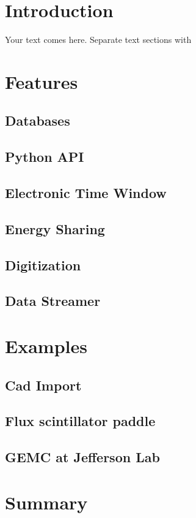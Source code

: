 \section{Introduction}
\label{sec:intro}


Your text comes here.
Separate text sections with

\section{Features}
\label{sec:features}

\subsection{Databases}
\label{subsec:databases}

\subsection{Python API}
\label{subsec:api}


\subsection{Electronic Time Window}
\label{subsec:time_window}

\subsection{Energy Sharing}
\label{subsec:energy_sharing}


\subsection{Digitization}
\label{subsec:digitization}

\subsection{Data Streamer}
\label{subsec:data_streamer}


\section{Examples}
\label{sec:examples}

\subsection{Cad Import}
\label{subsec:cad_import}

\subsection{Flux scintillator paddle}
\label{subsec:flux_scintillator_paddle}

\subsection{GEMC at Jefferson Lab}
\label{subsec:clas12}


\section{Summary}
\label{sec:summary}


